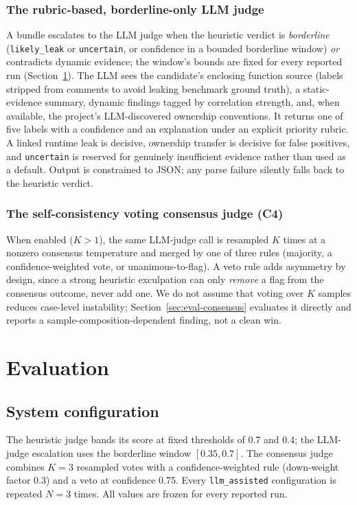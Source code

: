 \documentclass[a4paper]{llncs}
\begin{document}
\subsubsection{The rubric-based, borderline-only LLM judge}

A bundle escalates to the LLM judge when the heuristic verdict is
\emph{borderline} (\texttt{likely\_leak} or \texttt{uncertain}, or
confidence in a bounded borderline window) \emph{or} contradicts dynamic
evidence; the window's bounds are fixed for every reported run
(Section~\ref{sec:evaluation}). The LLM sees the candidate's enclosing
function source (labels stripped from comments to avoid leaking
benchmark ground truth), a static-evidence summary, dynamic findings
tagged by correlation strength, and, when available, the project's
LLM-discovered ownership conventions. It returns one of five labels with
a confidence and an explanation under an explicit priority rubric. A
linked runtime leak is decisive, ownership transfer is decisive
for false positives, and \texttt{uncertain} is reserved for genuinely insufficient evidence rather than used as a
default. Output is constrained to JSON;
any parse failure silently falls back to the heuristic verdict.

\subsubsection{The self-consistency voting consensus judge (C4)}

When enabled ($K>1$), the same LLM-judge call is resampled $K$ times at a
nonzero consensus temperature and merged by one of three rules (majority,
a confidence-weighted vote, or unanimous-to-flag). A veto rule
adds asymmetry by design, since a strong heuristic exculpation can only
\emph{remove} a flag from the consensus outcome, never add one. We do
not assume that voting over $K$ samples reduces case-level instability;
Section~\ref{sec:eval-consensus} evaluates it directly and
reports a sample-composition-dependent finding, not a clean win.

\section{Evaluation}
\label{sec:evaluation}

\subsection{System configuration}
The heuristic judge bands its
score at fixed thresholds of 0.7 and 0.4; the LLM-judge escalation uses
the borderline window $[0.35, 0.7]$. The consensus judge combines
$K{=}3$ resampled votes with a confidence-weighted rule (down-weight
factor 0.3) and a veto at confidence 0.75. Every
\texttt{llm\_assisted} configuration is repeated $N{=}3$ times. All
values are frozen for every reported run.
\end{document}
